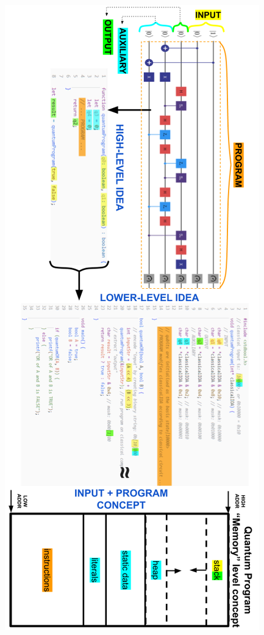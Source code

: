 \documentclass[conference]{IEEEtran}
\begin{document}
\begin{appendices}
\begin{strip} %
\centerline{
    \includegraphics[width=0.50\linewidth]{img/quantum_algorithm_visualised_compared.png}
}
\label{fig:quantumAlgorithmVisualised}
\end{strip}

\clearpage


\end{appendices}
\end{document}
